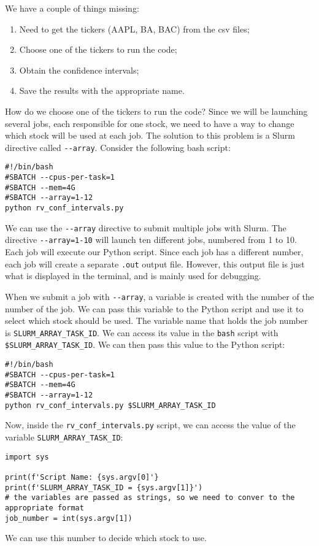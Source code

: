 \documentclass[12pt, a4paper]{article}
\begin{document}
We have a couple of things missing:
\begin{enumerate}
\item Need to get the tickers (AAPL, BA, BAC) from the csv files;
\item Choose one of the tickers to run the code;
\item Obtain the confidence intervals;
\item Save the results with the appropriate name.
\end{enumerate}

How do we choose one of the tickers to run the code?
Since we will be launching several jobs, each responsible for one stock, we need to have a way to change which stock will be used at each job.
The solution to this problem is a Slurm directive called \texttt{-{}-array}.
Consider the following bash script:
\lstset{language=bash,label= ,caption= ,captionpos=b,firstnumber=1,numbers=left,style=bash}
\begin{lstlisting}
#!/bin/bash
#SBATCH --cpus-per-task=1
#SBATCH --mem=4G
#SBATCH --array=1-12
python rv_conf_intervals.py
\end{lstlisting}
We can use the \texttt{-{}-array} directive to submit multiple jobs with Slurm.
The directive \texttt{-{}-array=1-10} will launch ten different jobs, numbered from 1 to 10.
Each job will execute our Python script.
Since each job has a different number, each job will create a separate \texttt{.out} output file.
However, this output file is just what is displayed in the terminal, and is mainly used for debugging.

When we submit a job with \texttt{-{}-array}, a variable is created with the number of the number of the job.
We can pass this variable to the Python script and use it to select which stock should be used.
The variable name that holds the job number is \texttt{SLURM\_ARRAY\_TASK\_ID}.
We can access its value in the \texttt{bash} script with \texttt{\$SLURM\_ARRAY\_TASK\_ID}.
We can then pass this value to the Python script:
\lstset{language=bash,label= ,caption= ,captionpos=b,firstnumber=1,numbers=left,style=bash}
\begin{lstlisting}
#!/bin/bash
#SBATCH --cpus-per-task=1
#SBATCH --mem=4G
#SBATCH --array=1-12
python rv_conf_intervals.py $SLURM_ARRAY_TASK_ID
\end{lstlisting}
Now, inside the \texttt{rv\_conf\_intervals.py} script, we can access the value of the variable  \texttt{SLURM\_ARRAY\_TASK\_ID}:
\lstset{language=jupyter-python,label= ,caption= ,captionpos=b,numbers=none}
\begin{lstlisting}
import sys

print(f'Script Name: {sys.argv[0]'}
print(f'SLURM_ARRAY_TASK_ID = {sys.argv[1]}')
# the variables are passed as strings, so we need to conver to the appropriate format
job_number = int(sys.argv[1])
\end{lstlisting}
We can use this number to decide which stock to use.
\end{document}
